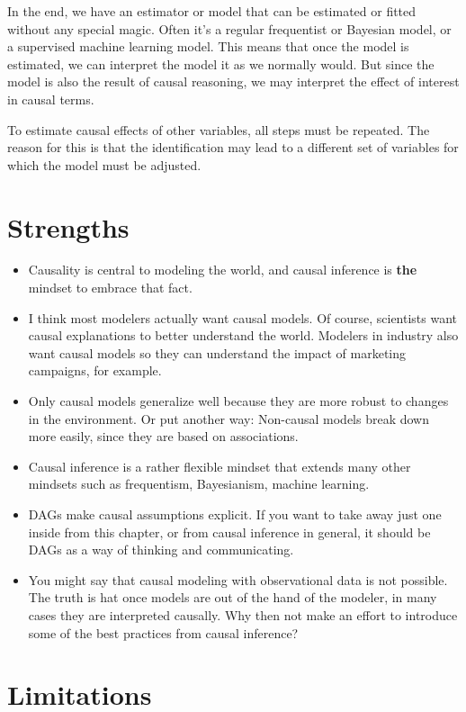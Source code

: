 \documentclass[
  10pt,
]{scrbook}
\providecommand{\tightlist}{%
  \setlength{\itemsep}{0pt}\setlength{\parskip}{0pt}}
\begin{document}
In the end, we have an estimator or model that can be estimated or fitted without any special magic.
Often it's a regular frequentist or Bayesian model, or a supervised machine learning model.
This means that once the model is estimated, we can interpret the model it as we normally would.
But since the model is also the result of causal reasoning, we may interpret the effect of interest in causal terms.

To estimate causal effects of other variables, all steps must be repeated.
The reason for this is that the identification may lead to a different set of variables for which the model must be adjusted.

\hypertarget{strengths-4}{%
\section{Strengths}\label{strengths-4}}

\begin{itemize}
\tightlist
\item
  Causality is central to modeling the world, and causal inference is \textbf{the} mindset to embrace that fact.
\item
  I think most modelers actually want causal models. Of course, scientists want causal explanations to better understand the world. Modelers in industry also want causal models so they can understand the impact of marketing campaigns, for example.
\item
  Only causal models generalize well because they are more robust to changes in the environment. Or put another way: Non-causal models break down more easily, since they are based on associations.
\item
  Causal inference is a rather flexible mindset that extends many other mindsets such as frequentism, Bayesianism, machine learning.
\item
  DAGs make causal assumptions explicit. If you want to take away just one inside from this chapter, or from causal inference in general, it should be DAGs as a way of thinking and communicating.
\item
  You might say that causal modeling with observational data is not possible. The truth is hat once models are out of the hand of the modeler, in many cases they are interpreted causally. Why then not make an effort to introduce some of the best practices from causal inference?
\end{itemize}

\hypertarget{limitations-4}{%
\section{Limitations}\label{limitations-4}}
\end{document}
